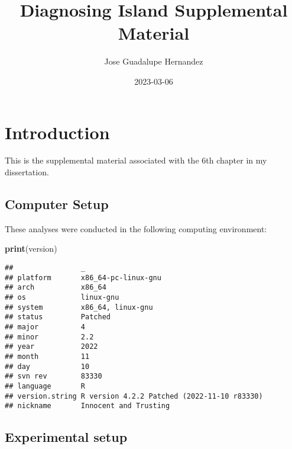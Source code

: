 \documentclass[]{book}
\title{Diagnosing Island Supplemental Material}
\author{Jose Guadalupe Hernandez}
\date{2023-03-06}
\newenvironment{Shaded}{\begin{snugshade}}{\end{snugshade}}
\newcommand{\KeywordTok}[1]{\textcolor[rgb]{0.13,0.29,0.53}{\textbf{#1}}}
\newcommand{\NormalTok}[1]{#1}
\begin{document}
\maketitle

{
\setcounter{tocdepth}{1}
\tableofcontents
}
\hypertarget{introduction}{%
\chapter{Introduction}\label{introduction}}

This is the supplemental material associated with the 6th chapter in my dissertation.

\hypertarget{computer-setup}{%
\section{Computer Setup}\label{computer-setup}}

These analyses were conducted in the following computing environment:

\begin{Shaded}
\begin{Highlighting}[]
\KeywordTok{print}\NormalTok{(version)}
\end{Highlighting}
\end{Shaded}

\begin{verbatim}
##                _                                          
## platform       x86_64-pc-linux-gnu                        
## arch           x86_64                                     
## os             linux-gnu                                  
## system         x86_64, linux-gnu                          
## status         Patched                                    
## major          4                                          
## minor          2.2                                        
## year           2022                                       
## month          11                                         
## day            10                                         
## svn rev        83330                                      
## language       R                                          
## version.string R version 4.2.2 Patched (2022-11-10 r83330)
## nickname       Innocent and Trusting
\end{verbatim}

\hypertarget{experimental-setup}{%
\section{Experimental setup}\label{experimental-setup}}
\end{document}
